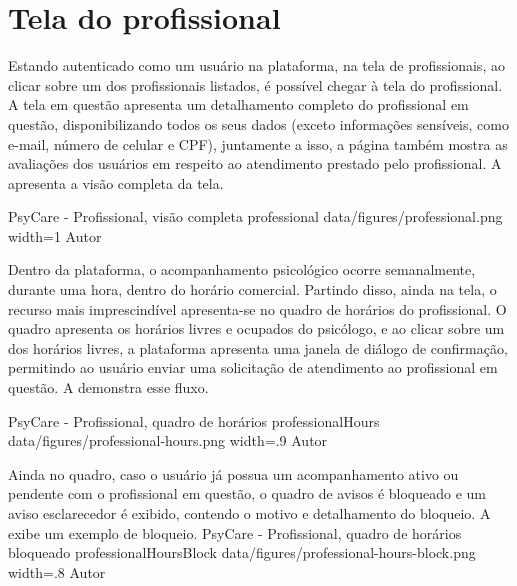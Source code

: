 \section{Tela do profissional}
\label{sec:profissional}

Estando autenticado como um usuário na plataforma, na tela de profissionais, ao clicar sobre um dos profissionais listados, é possível chegar à tela do profissional. A tela em questão apresenta um detalhamento completo do profissional em questão, disponibilizando todos os seus dados (exceto informações sensíveis, como e-mail, número de celular e CPF), juntamente a isso, a página também mostra as avaliações dos usuários em respeito ao atendimento prestado pelo profissional. A  apresenta a visão completa da tela.

\image
    {PsyCare - Profissional, visão completa}
    {professional}
    {data/figures/professional.png}
    {width=1\textwidth}
    {Autor}

Dentro da plataforma, o acompanhamento psicológico ocorre semanalmente, durante uma hora, dentro do horário comercial. Partindo disso, ainda na tela, o recurso mais imprescindível apresenta-se no quadro de horários do profissional. O quadro apresenta os horários livres e ocupados do psicólogo, e ao clicar sobre um dos horários livres, a plataforma apresenta uma janela de diálogo de confirmação, permitindo ao usuário enviar uma solicitação de atendimento ao profissional em questão. A  demonstra esse fluxo.

\image
    {PsyCare - Profissional, quadro de horários}
    {professionalHours}
    {data/figures/professional-hours.png}
    {width=.9\textwidth}
    {Autor}

Ainda no quadro, caso o usuário já possua um acompanhamento ativo ou pendente com o profissional em questão, o quadro de avisos é bloqueado e um aviso esclarecedor é exibido, contendo o motivo e detalhamento do bloqueio. A  exibe um exemplo de bloqueio.
\image
    {PsyCare - Profissional, quadro de horários bloqueado}
    {professionalHoursBlock}
    {data/figures/professional-hours-block.png}
    {width=.8\textwidth}
    {Autor}